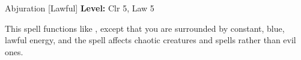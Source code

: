 {Abjuration [Lawful]}
{
	\textbf{Level:}
	Clr 5, Law 5\\
}
{
	This spell functions like , except that you are surrounded by constant, blue, lawful energy, and the spell affects chaotic creatures and spells rather than evil ones.

}
